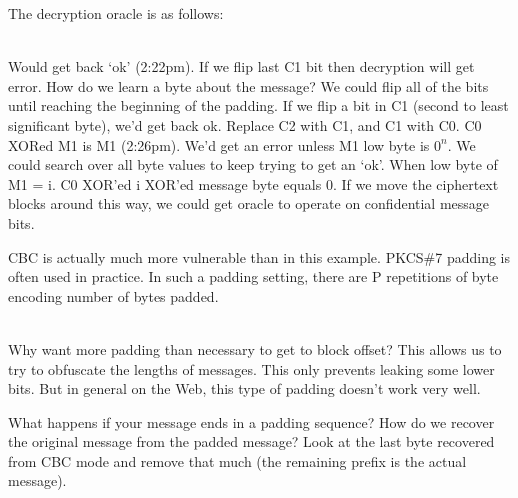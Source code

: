 The decryption oracle is as follows:

\vspace{0.2cm}\\

Would get back `ok' (2:22pm). If we flip last C1 bit then decryption will get error. How do we learn a byte about the message? We could flip all of the bits until reaching the beginning of the padding.
If we flip a bit in C1 (second to least significant byte), we'd get back ok. Replace C2 with C1, and C1 with C0. C0 XORed M1 is M1 (2:26pm). We'd get an error unless M1 low byte is $0^n$. We could search over all byte values to keep trying to get an `ok'. When low byte of M1 = i. C0 XOR'ed i XOR'ed message byte equals 0. If we move the ciphertext blocks around this way, we could get oracle to operate on confidential message bits.

CBC is actually much more vulnerable than in this example. PKCS\#7 padding is often used in practice. In such a padding setting, there are P repetitions of byte encoding number of bytes padded. 

\vspace{0.2cm}\\

Why want more padding than necessary to get to block offset? This allows us to try to obfuscate the lengths of messages. This only prevents leaking some lower bits. But in general on the Web, this type of padding doesn't work very well.

What happens if your message ends in a padding sequence? How do we recover the original message from the padded message? Look at the last byte recovered from CBC mode and remove that much (the remaining prefix is the actual message).

